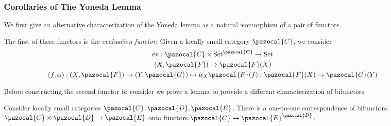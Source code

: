 \subsubsection{Corollaries of The Yoneda Lemma}
We first give an alternative characterization of the Yoneda lemma as a natural isomorphism of a pair of functors. 
\begin{definition} 
    The first of these functors is the \emph{evaluation functor}: Given a locally small category $\pazocal{C}$, we consider 
    \begin{gather*}
        \ev: \pazocal{C}\times \mathrm{Set}^\pazocal{C}\rightarrow \mathrm{Set}\\
        (X,\pazocal{F})\mapsto \pazocal{F}(X)\\
        (f,\alpha): (X,\pazocal{F})\rightarrow (Y,\pazocal{G})\mapsto \alpha_X\pazocal{F}(f) : \pazocal{F}(X)\rightarrow \pazocal{G}(Y)
    \end{gather*}
\end{definition} 
Before constructing the second functor to consider we prove a lemma to provide a different characterization of bifunctors
\begin{lemma}\label{BifunctorAsFunctorToFunctorCategory}
    Consider locally small categories $\pazocal{C},\pazocal{D},\pazocal{E}$. There is a one-to-one correspondence of bifunctors $\pazocal{C}\times \pazocal{D}\rightarrow \pazocal{E}$ onto functors $\pazocal{C}\rightarrow\pazocal{E}^\pazocal{D}$.
\end{lemma}
